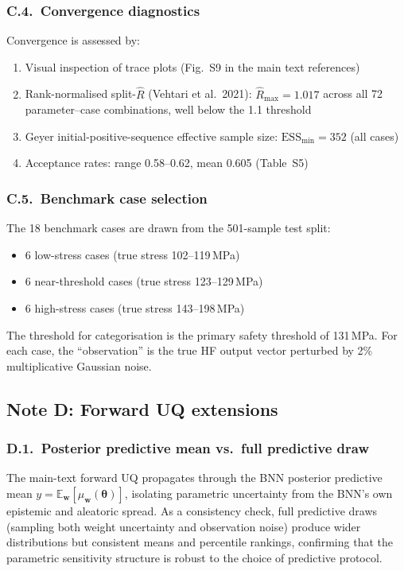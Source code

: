 \documentclass[11pt,a4paper]{article}
\begin{document}
\subsubsection*{C.4.~Convergence diagnostics}

Convergence is assessed by:
\begin{enumerate}
\item Visual inspection of trace plots (Fig.~S9 in the main text
  references)
\item Rank-normalised split-$\hat{R}$ (Vehtari et al.\ 2021):
  $\hat{R}_\mathrm{max} = 1.017$ across all 72 parameter--case
  combinations, well below the 1.1 threshold
\item Geyer initial-positive-sequence effective sample size:
  $\mathrm{ESS}_\mathrm{min} = 352$ (all cases)
\item Acceptance rates: range 0.58--0.62, mean 0.605 (Table~S5)
\end{enumerate}

\subsubsection*{C.5.~Benchmark case selection}

The 18 benchmark cases are drawn from the 501-sample test split:
\begin{itemize}
\item 6 low-stress cases (true stress 102--119\,MPa)
\item 6 near-threshold cases (true stress 123--129\,MPa)
\item 6 high-stress cases (true stress 143--198\,MPa)
\end{itemize}
The threshold for categorisation is the primary safety threshold of
131\,MPa. For each case, the ``observation'' is the true HF output
vector perturbed by 2\% multiplicative Gaussian noise.


\subsection{Note D: Forward UQ extensions}

\subsubsection*{D.1.~Posterior predictive mean vs.\ full predictive draw}

The main-text forward UQ propagates through the BNN posterior predictive
mean $y = \mathbb{E}_{\mathbf{w}}[\mu_{\mathbf{w}}(\boldsymbol{\theta})]$,
isolating parametric uncertainty from the BNN's own epistemic and
aleatoric spread. As a consistency check, full predictive draws
(sampling both weight uncertainty and observation noise) produce wider
distributions but consistent means and percentile rankings, confirming
that the parametric sensitivity structure is robust to the choice of
predictive protocol.
\end{document}
